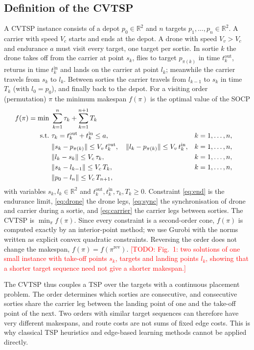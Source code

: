 \documentclass[preprint,review,12pt,authoryear]{elsarticle}
\newcommand{\todo}[1]{\textcolor{red}{[TODO: #1]}}
\newcommand{\R}{\mathbb{R}}
\begin{document}
\subsection{Definition of the CVTSP}\label{sec:def}
A CVTSP instance consists of a depot $p_0\in\R^2$ and $n$ targets $p_1,\dots,p_n\in\R^2$. A carrier with speed
$V_c$ starts and ends at the depot. A drone with speed $V_v>V_c$ and endurance $a$ must visit every target, one
target per sortie. In sortie $k$ the drone takes off from the carrier at point $s_k$, flies to target
$p_{\pi(k)}$ in time $t^{\mathrm{out}}_k$, returns in time $t^{\mathrm{in}}_k$ and lands on the carrier at point
$l_k$; meanwhile the carrier travels from $s_k$ to $l_k$. Between sorties the carrier travels from $l_{k-1}$ to
$s_k$ in time $T_k$ (with $l_0=p_0$), and finally back to the depot. For a visiting order (permutation) $\pi$ the
minimum makespan $f(\pi)$ is the optimal value of the SOCP
\begin{align}
f(\pi)=\min\ & \sum_{k=1}^{n} \tau_k + \sum_{k=1}^{n+1} T_k \label{eq:obj}\\
\text{s.t.}\ & \tau_k = t^{\mathrm{out}}_k + t^{\mathrm{in}}_k \le a, && k=1,\dots,n, \label{eq:end}\\
& \|s_k - p_{\pi(k)}\| \le V_v\, t^{\mathrm{out}}_k,\quad \|l_k - p_{\pi(k)}\| \le V_v\, t^{\mathrm{in}}_k,
 && k=1,\dots,n, \label{eq:drone}\\
& \|l_k - s_k\| \le V_c\, \tau_k, && k=1,\dots,n, \label{eq:sync}\\
& \|s_k - l_{k-1}\| \le V_c\, T_k, && k=1,\dots,n, \label{eq:carrier}\\
& \|p_0 - l_n\| \le V_c\, T_{n+1}, \notag
\end{align}
with variables $s_k,l_k\in\R^2$ and $t^{\mathrm{out}}_k,t^{\mathrm{in}}_k,\tau_k,T_k\ge0$. Constraint
\eqref{eq:end} is the endurance limit, \eqref{eq:drone} the drone legs, \eqref{eq:sync} the synchronisation of
drone and carrier during a sortie, and \eqref{eq:carrier} the carrier legs between sorties. The CVTSP is
$\min_\pi f(\pi)$. Since every constraint is a second-order cone, $f(\pi)$ is computed exactly by an
interior-point method; we use Gurobi with the norms written as explicit convex quadratic constraints. Reversing
the order does not change the makespan, $f(\pi)=f(\pi^{\mathrm{rev}})$.
\todo{Fig.~1: two solutions of one small instance with take-off points $s_k$, targets and landing points $l_k$,
showing that a shorter target sequence need not give a shorter makespan.}

The CVTSP thus couples a TSP over the targets with a continuous placement problem. The order determines which
sorties are consecutive, and consecutive sorties share the carrier leg between the landing point of one and the
take-off point of the next. Two orders with similar target sequences can therefore have very different makespans,
and route costs are not sums of fixed edge costs. This is why classical TSP heuristics and edge-based learning
methods cannot be applied directly.
\end{document}
